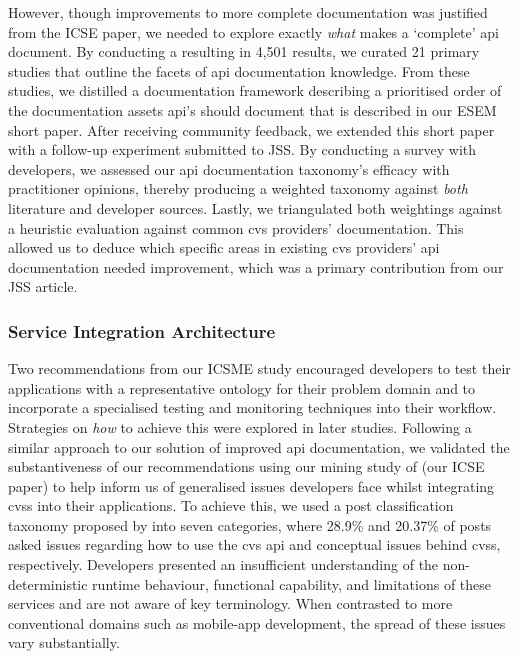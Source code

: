 However, though improvements to more complete documentation was justified from the ICSE paper, we needed to explore exactly \textit{what} makes a `complete' \gls{api} document. By conducting a  resulting in 4,501 results, we curated 21 primary studies that outline the facets of \gls{api} documentation knowledge. From these studies, we distilled a documentation framework describing a prioritised order of the documentation assets \gls{api}'s should document that is described in our ESEM short paper. After receiving community feedback, we extended this short paper with a follow-up experiment submitted to JSS. By conducting a survey with developers, we assessed our \gls{api} documentation taxonomy's efficacy with practitioner opinions, thereby producing a weighted taxonomy against \textit{both} literature and developer sources. Lastly, we triangulated both weightings against a heuristic evaluation against common \gls{cvs} providers' documentation. This allowed us to deduce which specific areas in existing \gls{cvs} providers' \gls{api} documentation needed improvement, which was a primary contribution from our JSS article.

\subsubsection{Service Integration Architecture}

Two recommendations from our ICSME study encouraged developers to test their applications with a representative ontology for their problem domain and to incorporate a specialised testing and monitoring techniques into their workflow. Strategies on \textit{how} to achieve this were explored in later studies.  Following a similar approach to our solution of improved \gls{api} documentation, we validated the substantiveness of our recommendations using our mining study of  (our ICSE paper) to help inform us of generalised issues developers face whilst integrating \glspl{cvs} into their applications. To achieve this, we used a  post classification taxonomy proposed by \citet{Beyer:2018fm} into seven categories, where 28.9\% and 20.37\% of posts asked issues regarding how to use the \gls{cvs} \gls{api} and conceptual issues behind \glspl{cvs}, respectively. Developers presented an insufficient understanding of the non-deterministic runtime behaviour, functional capability, and limitations of these services and are not aware of key  terminology. When contrasted to more conventional domains such as mobile-app development, the spread of these issues vary substantially.

